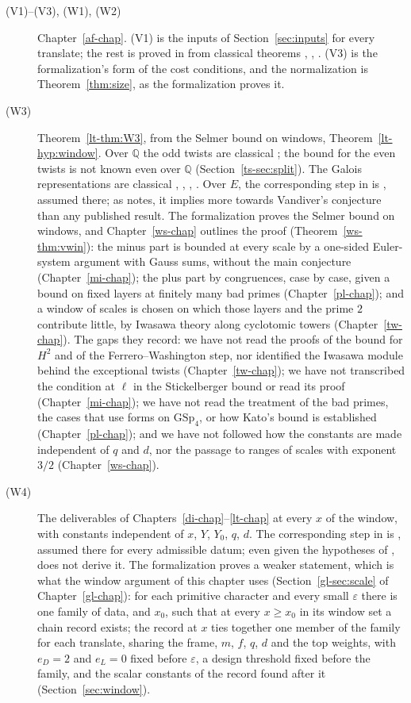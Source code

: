 \documentclass[reqno]{amsart}
\newcounter{chap}
\theoremstyle{definition}
\theoremstyle{plain}
\newcommand{\Q}{\mathbb{Q}}
\begin{document}
{\begin{description}
\item[(V1)--(V3), (W1), (W2)] Chapter~\ref{af-chap}.  (V1) is the inputs of Section~\ref{sec:inputs} for every translate; the rest is proved in \cite[\S\S4--6]{Adr} from classical theorems \cite{Gal}, \cite{Pa}, \cite[Ch.~14]{Dav}.  (V3) is the formalization's form of the cost conditions, and the normalization is Theorem~\ref{thm:size}, \cite[Lemma~6.1]{Zh} as the formalization proves it.
\item[(W3)] Theorem~\ref{lt-thm:W3}, from the Selmer bound on windows, Theorem~\ref{lt-hyp:window}.  Over \(\Q\) the odd twists are classical \cite{MW}; the bound for the even twists is not known even over \(\Q\) (Section~\ref{ts-sec:split}).  The Galois representations are classical \cite{HT}, \cite{Shi}, \cite{CH}, \cite{Car1}.  Over \(E\), the corresponding step in \cite{Adr} is \cite[Hyp.~17.11]{Adr}, assumed there; as \cite[\S17.4]{Adr} notes, it implies more towards Vandiver's conjecture than any published result.  The formalization proves the Selmer bound on windows, and Chapter~\ref{ws-chap} outlines the proof (Theorem~\ref{ws-thm:vwin}): the minus part is bounded at every scale by a one-sided Euler-system argument with Gauss sums, without the main conjecture (Chapter~\ref{mi-chap}); the plus part by congruences, case by case, given a bound on fixed layers at finitely many bad primes (Chapter~\ref{pl-chap}); and a window of scales is chosen on which those layers and the prime \(2\) contribute little, by Iwasawa theory along cyclotomic towers (Chapter~\ref{tw-chap}).  The gaps they record: we have not read the proofs of the bound for \(H^2\) and of the Ferrero--Washington step, nor identified the Iwasawa module behind the exceptional twists (Chapter~\ref{tw-chap}); we have not transcribed the condition at \(\ell\) in the Stickelberger bound or read its proof (Chapter~\ref{mi-chap}); we have not read the treatment of the bad primes, the cases that use forms on \(\mathrm{GSp}_4\), or how Kato's bound is established (Chapter~\ref{pl-chap}); and we have not followed how the constants are made independent of \(q\) and \(d\), nor the passage to ranges of scales with exponent \(3/2\) (Chapter~\ref{ws-chap}).
\item[(W4)] The deliverables of Chapters~\ref{di-chap}--\ref{lt-chap} at every \(x\) of the window, with constants independent of \(x\), \(Y\), \(Y_0\), \(q\), \(d\).  The corresponding step in \cite{Adr} is \cite[Hyp.~18.10]{Adr}, assumed there for every admissible datum; even given the hypotheses of \cite[\S\S11--17]{Adr}, \cite[\S18.3]{Adr} does not derive it.  The formalization proves a weaker statement, which is what the window argument of this chapter uses (Section~\ref{gl-sec:scale} of Chapter~\ref{gl-chap}): for each primitive character and every small \(\varepsilon\) there is one family of data, and \(x_0\), such that at every \(x \ge x_0\) in its window set a chain record exists; the record at \(x\) ties together one member of the family for each translate, sharing the frame, \(m\), \(f\), \(q\), \(d\) and the top weights, with \(e_D = 2\) and \(e_L = 0\) fixed before \(\varepsilon\), a design threshold fixed before the family, and the scalar constants of the record found after it (Section~\ref{sec:window}).

\end{description}}
\end{document}
